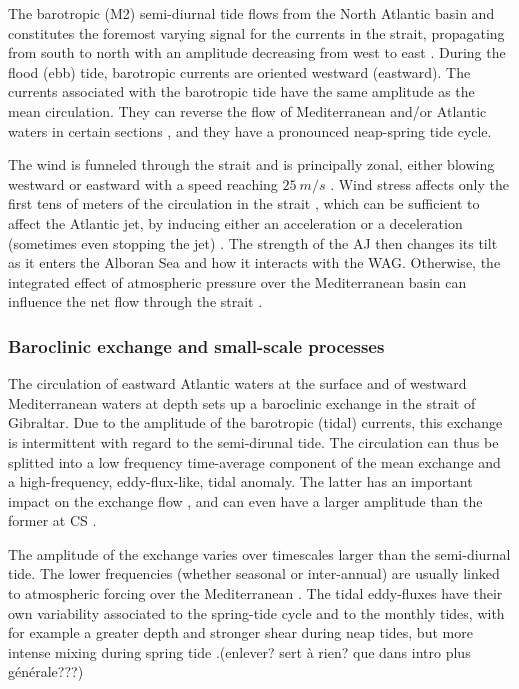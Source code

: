 The barotropic (M2) semi-diurnal tide flows from the North Atlantic basin and constitutes the foremost varying signal for the currents in the strait, propagating from south to north with an amplitude decreasing from west to east \citep{candela_1990}. During the flood (ebb) tide, barotropic currents are oriented westward (eastward). The currents associated with the barotropic tide have the same amplitude as the mean circulation. They can reverse the flow of Mediterranean and/or Atlantic waters in certain sections \citep{sanchez-roman_2012}, and they have a pronounced neap-spring tide cycle.

The wind is funneled through the strait and is principally zonal, either blowing westward or eastward with a speed reaching $25\ m/s$ \citep{candela_1989}. Wind stress affects only the first tens of meters of the circulation in the strait \citep{candela_1989}, which can be sufficient to affect the Atlantic jet, by inducing either an acceleration or a deceleration (sometimes even stopping the jet) \citep{lorente_2019}. The strength of the AJ then changes its tilt as it enters the Alboran Sea and how it interacts with the WAG. Otherwise, the integrated effect of atmospheric pressure over the Mediterranean basin can influence the net flow through the strait \citep{garcialafuente_2002}.



\subsubsection{Baroclinic exchange and small-scale processes}


The circulation of eastward Atlantic waters at the surface and of westward Mediterranean waters at depth sets up a baroclinic exchange in the strait of Gibraltar. Due to the amplitude of the barotropic (tidal) currents, this exchange is intermittent with regard to the semi-dirunal tide. The circulation can thus be splitted into a low frequency time-average component of the mean exchange and a high-frequency, eddy-flux-like, tidal anomaly. The latter has an important impact on the exchange flow \citep{naranjo_2014}, and can even have a larger amplitude than the former at CS \citep{vargas_2006}.

The amplitude of the exchange varies over timescales larger than the semi-diurnal tide. The lower frequencies (whether seasonal or inter-annual) are usually linked to atmospheric forcing over the Mediterranean \citep{sanchez-roman_2012}. The tidal eddy-fluxes have their own variability associated to the spring-tide cycle and to the monthly tides, with for example a greater depth and stronger shear during neap tides, but more intense mixing during spring tide \citep{naranjo_2014,vargas_2006}.\color{red}(enlever? sert à rien? que dans intro plus générale???)\color{black}

